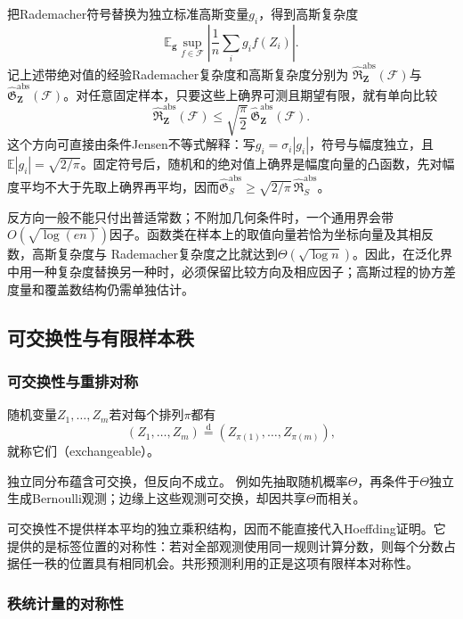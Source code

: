 把Rademacher符号替换为独立标准高斯变量\(g_i\)，得到高斯复杂度
\[ \mathbb{E}_{\bm{g}}
  \sup_{f\in\mathcal{F}}
  \left|\frac{1}{n}\sum_i g_i f(Z_i)\right|. \]
记上述带绝对值的经验Rademacher复杂度和高斯复杂度分别为
\(\widehat{\mathfrak{R}}_{\bm{Z}}^{\mathrm{abs}}(\mathcal{F})\)与
\(\widehat{\mathfrak{G}}_{\bm{Z}}^{\mathrm{abs}}(\mathcal{F})\)。对任意固定样本，只要这些上确界可测且期望有限，就有单向比较
\[
  \widehat{\mathfrak{R}}_{\bm{Z}}^{\mathrm{abs}}(\mathcal{F})
  \leq
  \sqrt{\frac{\pi}{2}}\,
  \widehat{\mathfrak{G}}_{\bm{Z}}^{\mathrm{abs}}(\mathcal{F}).
\]
这个方向可直接由条件Jensen不等式解释：写\(g_i=\sigma_i|g_i|\)，符号与幅度独立，且\(\mathbb E|g_i|=\sqrt{2/\pi}\)。固定符号后，随机和的绝对值上确界是幅度向量的凸函数，先对幅度平均不大于先取上确界再平均，因而\(\widehat{\mathfrak G}^{\mathrm{abs}}_S\geq\sqrt{2/\pi}\,\widehat{\mathfrak R}^{\mathrm{abs}}_S\)。

反方向一般不能只付出普适常数；不附加几何条件时，一个通用界会带
\(O(\sqrt{\log(en)})\)因子。函数类在样本上的取值向量若恰为坐标向量及其相反数，高斯复杂度与
Rademacher复杂度之比就达到\(\Theta(\sqrt{\log n})\)。因此，在泛化界中用一种复杂度替换另一种时，必须保留比较方向及相应因子；高斯过程的协方差度量和覆盖数结构仍需单独估计。

\subsection{可交换性与有限样本秩}
\label{sec:probability-exchangeability-conformal-ranks}

\subsubsection{可交换性与重排对称}

\begin{definition}[可交换随机变量]
  \label{def:probability-exchangeability}
随机变量\(Z_1,\ldots,Z_m\)若对每个排列\(\pi\)都有
\[ (Z_1,\ldots,Z_m)
  \overset{\mathrm{d}}{=}(Z_{\pi(1)},\ldots,Z_{\pi(m)}), \]
就称它们（exchangeable）。
\end{definition}
独立同分布蕴含可交换，但反向不成立。
例如先抽取随机概率\(\Theta\)，再条件于\(\Theta\)独立生成Bernoulli观测；边缘上这些观测可交换，却因共享\(\Theta\)而相关。

可交换性不提供样本平均的独立乘积结构，因而不能直接代入Hoeffding证明。它提供的是标签位置的对称性：若对全部观测使用同一规则计算分数，则每个分数占据任一秩的位置具有相同机会。共形预测利用的正是这项有限样本对称性。

\subsubsection{秩统计量的对称性}


